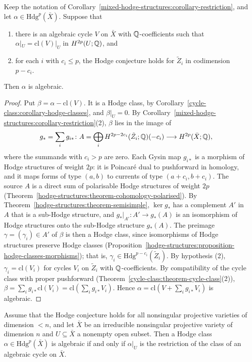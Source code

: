 \begin{proposition}\label{mixed-hodge-structures:proposition-localisation}
Keep the notation of Corollary~\ref{mixed-hodge-structures:corollary-restriction}, and let $\alpha \in \mathrm{Hdg}^p(\bar X)$. Suppose that
\begin{enumerate}
\item there is an algebraic cycle $V$ on $\bar X$ with $\mathbb{Q}$-coefficients such that $\alpha|_U = \mathrm{cl}(V)|_U$ in $H^{2p}(U; \mathbb{Q})$, and
\item for each $i$ with $c_i \leq p$, the Hodge conjecture holds for $\tilde Z_i$ in codimension $p - c_i$.
\end{enumerate}
Then $\alpha$ is algebraic.
\end{proposition}

\begin{proof}
Put $\beta = \alpha - \mathrm{cl}(V)$. It is a Hodge class, by Corollary~\ref{cycle-class:corollary-hodge-classes}, and $\beta|_U = 0$. By Corollary~\ref{mixed-hodge-structures:corollary-restriction}(2),
$\beta$ lies in the image of
\[
g_* = \sum_ig_{i*} \colon A = \bigoplus_iH^{2p-2c_i}(\tilde Z_i; \mathbb{Q})(-c_i) \longrightarrow H^{2p}(\bar X; \mathbb{Q}),
\]
where the summands with $c_i > p$ are zero. Each Gysin map $g_{i*}$ is a morphism of Hodge structures of weight $2p$: it is Poincar\'e dual to pushforward in homology, and it maps forms of type $(a, b)$
to currents of type $(a + c_i, b + c_i)$. The source $A$ is a direct sum of polarisable Hodge structures of weight $2p$ (Theorem~\ref{hodge-structures:theorem-cohomology-polarised}). By
Theorem~\ref{hodge-structures:theorem-semisimple}, $\ker g_*$ has a complement $A'$ in $A$ that is a sub-Hodge structure, and $g_*|_{A'} \colon A' \to g_*(A)$ is an isomorphism of Hodge structures onto the
sub-Hodge structure $g_*(A)$. The preimage $\gamma = (\gamma_i) \in A'$ of $\beta$ is then a Hodge class, since isomorphisms of Hodge structures preserve Hodge classes
(Proposition~\ref{hodge-structures:proposition-hodge-classes-morphisms}); that is, $\gamma_i \in \mathrm{Hdg}^{p-c_i}(\tilde Z_i)$. By hypothesis (2), $\gamma_i = \mathrm{cl}(V_i)$ for cycles $V_i$ on $\tilde Z_i$
with $\mathbb{Q}$-coefficients. By compatibility of the cycle class with proper pushforward (Theorem~\ref{cycle-class:theorem-cycle-class}(2)), $\beta = \sum_ig_{i*}\mathrm{cl}(V_i) = \mathrm{cl}(\sum_ig_{i*}V_i)$.
Hence $\alpha = \mathrm{cl}(V + \sum_ig_{i*}V_i)$ is algebraic.
\end{proof}

\begin{corollary}\label{mixed-hodge-structures:corollary-localisation}
Assume that the Hodge conjecture holds for all nonsingular projective varieties of dimension $< n$, and let $\bar X$ be an irreducible nonsingular projective variety of dimension $n$ and
$U \subseteq \bar X$ a nonempty open subset. Then a Hodge class $\alpha \in \mathrm{Hdg}^p(\bar X)$ is algebraic if and only if $\alpha|_U$ is the restriction of the class of an algebraic cycle on $\bar X$.
\end{corollary}

